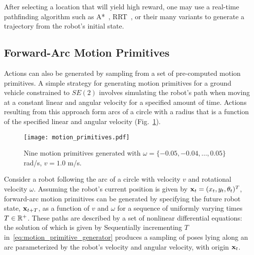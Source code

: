 After selecting a location that will yield high reward,
one may use a real-time pathfinding algorithm such as A*~\cite{hart1968formal},
RRT~\cite{lavalle1998rapidly}, or their many variants to generate a trajectory from
the robot's initial state.

\subsection{Forward-Arc Motion Primitives}
\label{subsec:fa_motion_primitives}

Actions can also be generated by sampling from a set of
pre-computed motion primitives. A simple strategy for generating motion
primitives for a ground vehicle constrained to $SE(2)$ involves
simulating the robot's path when moving at a constant linear and angular
velocity for a specified amount of time.
Actions resulting from this approach form arcs of a circle with a radius that is a
function of the specified linear and angular velocity (Fig.~\ref{fig:motion_prims}).
%
\begin{figure}[hb]
  \centering
  \texttt{[image: motion\_primitives.pdf]}
  \caption{Nine motion primitives generated with $\omega = \{-0.05, -0.04,
  \dots, 0.05\}$ rad/s, $v = 1.0$ m/s.\label{fig:motion_prims}}
\end{figure}

Consider a robot following the arc of a
circle with velocity $v$ and rotational velocity $\omega$. Assuming the robot's
current position is given by $\mathbf{x}_t=(x_t,y_t,\theta_t)^T$, forward-arc motion primitives
can be generated by specifying the future robot state, $\mathbf{x}_{t+T}$,
as a function of $v$ and $\omega$ for a sequence of uniformly varying
times $T \in {\mathbb{R}}^{+}$. These paths are described
by a set of nonlinear differential equations:
%
%
the solution of which is given by
%
%
Sequentially incrementing $T$ in~\eqref{eq:motion_primitive_generator}
produces a sampling of poses lying along an arc
parameterized by the robot's velocity and angular velocity, with origin $\mathbf{x}_{t}$.

